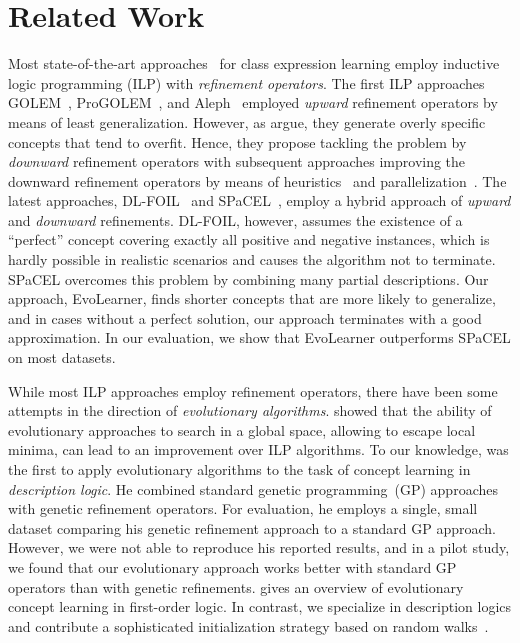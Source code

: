 \section{Related Work}%
\label{sec:related-work}

Most state-of-the-art approaches~\citep{Lehmann2009DL-Learner,Lehmann2010Concept,Tran2012Approach} for class expression learning employ inductive logic programming (ILP) with \emph{refinement operators}. The first ILP approaches GOLEM~\citep{Muggleton1990Efficient,Muggleton1991Inductive}, ProGOLEM~\citep{Muggleton2009ProGolem}, and Aleph~\citep{Muggleton1995Inverse} employed \emph{upward} refinement operators by means of least generalization. However, as \citet{Badea2000Refinement} argue, they generate overly specific concepts that tend to overfit. Hence, they propose tackling the problem by \emph{downward} refinement operators with subsequent approaches improving the downward refinement operators by means of heuristics~\citep{Lehmann2010Concept,Lehmann2011Class} and parallelization~\citep{Tran2012Approach}. The latest approaches, DL-FOIL~\citep{Fanizzi2018DLFoil} and SPaCEL~\citep{Tran2017Parallel}, employ a hybrid approach of \emph{upward} and \emph{downward} refinements. DL-FOIL, however, assumes the existence of a ``perfect'' concept covering exactly all positive and negative instances, which is hardly possible in realistic scenarios and causes the algorithm not to terminate. SPaCEL overcomes this problem by combining many partial descriptions. Our approach, Evo\-Learner, finds shorter concepts that are more likely to generalize, and in cases without a perfect solution, our approach terminates with a good approximation. In our evaluation, we show that  EvoLearner outperforms SPaCEL on most datasets.

While most ILP approaches employ refinement operators, there have been some attempts in the direction of \emph{evolutionary algorithms}. \mbox{\citet{Reiser1999Evolution}} showed that the ability of evolutionary approaches to search in a global space, allowing to escape local minima, can lead to an improvement over ILP algorithms. To our knowledge, \citet{Lehmann2007Hybrid} was the first to apply evolutionary algorithms to the task of concept learning in \emph{description logic}. He combined standard genetic programming~(GP) approaches with genetic refinement operators. For evaluation, he employs a single, small dataset comparing his genetic refinement approach to a standard GP approach. However, we were not able to reproduce his reported results, and in a pilot study, we found that our evolutionary approach works better with standard GP operators than with genetic refinements. \citet{Divina2006Evolutionary} gives an overview of evolutionary concept learning in first-order logic. In contrast, we specialize in description logics and contribute a sophisticated initialization strategy based on random walks~\citep{Fronczak2009Biased, Sinatra2011Maximal}.
